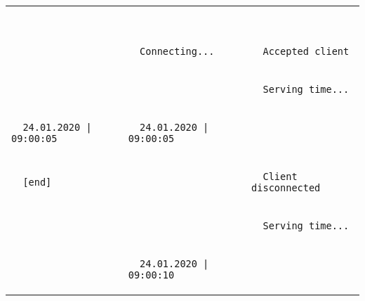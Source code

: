 \documentclass[]{article}
\begin{document}
\begin{enumerate}
\begin{tabular}{lll}
\begin{lstlisting}
  \end{lstlisting}\\
  \begin{lstlisting}
  \end{lstlisting}&
  \begin{lstlisting} 
  Connecting...
  \end{lstlisting}&
  \begin{lstlisting}
  Accepted client
  \end{lstlisting}\\
  \begin{lstlisting}
  \end{lstlisting}&
  \begin{lstlisting} 
  \end{lstlisting}&
  \begin{lstlisting}
  Serving time...
  \end{lstlisting}\\
  \begin{lstlisting}
  24.01.2020 | 09:00:05
  \end{lstlisting}&
  \begin{lstlisting}   
  24.01.2020 | 09:00:05
  \end{lstlisting}&
  \begin{lstlisting}
  \end{lstlisting}\\
  \begin{lstlisting}
  [end]
  \end{lstlisting}&
  \begin{lstlisting}   
  \end{lstlisting}&
  \begin{lstlisting}
  Client disconnected
  \end{lstlisting}\\
  \begin{lstlisting}
  \end{lstlisting}&
  \begin{lstlisting}   
  \end{lstlisting}&
  \begin{lstlisting}
  Serving time...
  \end{lstlisting}\\
  \begin{lstlisting}
  \end{lstlisting}&
  \begin{lstlisting}   
  24.01.2020 | 09:00:10
  \end{lstlisting}&
  \begin{lstlisting}

\end{lstlisting}
\end{tabular}
\end{enumerate}
\end{document}

